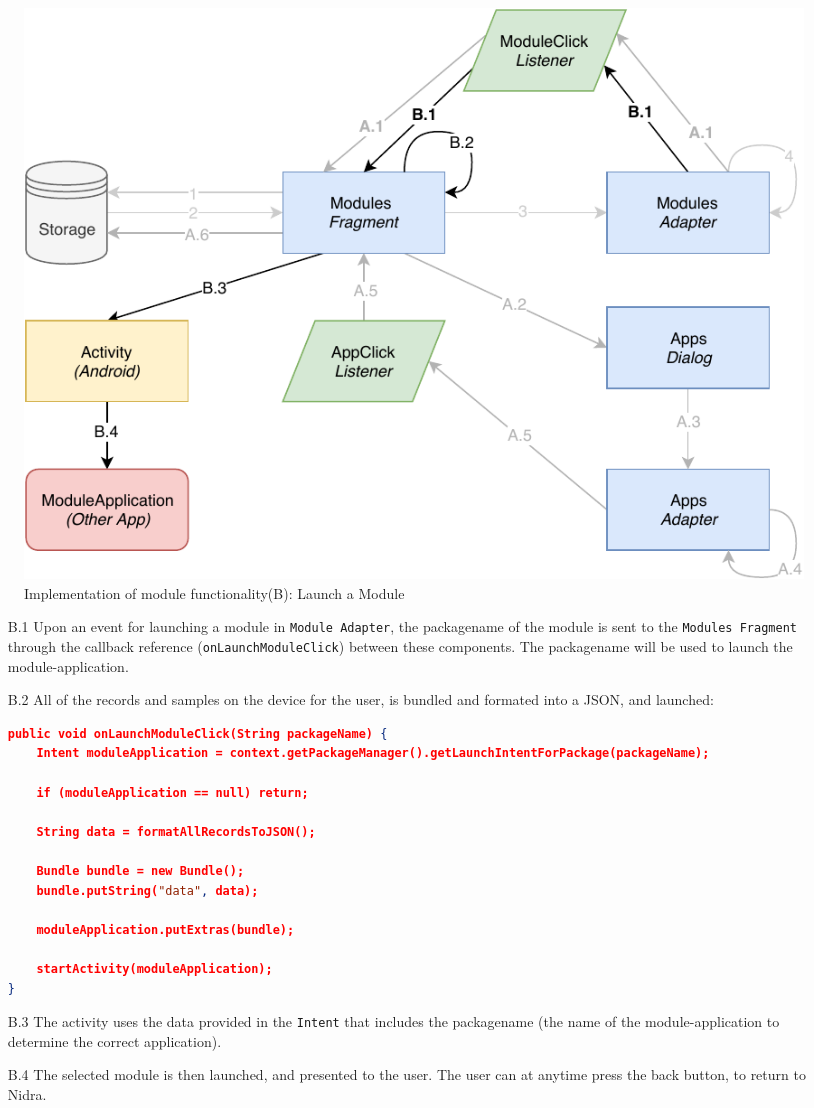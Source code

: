 \begin{figure}
    \centering
    \includegraphics[scale=0.7]{images/Module_ImpB.pdf}
    \caption{Implementation of module functionality(B): Launch a Module}
    \label{fig:impl_modulesB}
\end{figure}

\begin{itemize}
    \item[B.1] Upon an event for launching a module in \verb|Module Adapter|, the packagename of the module is sent to the \verb|Modules Fragment| through the callback reference (\verb|onLaunchModuleClick|) between these components. The packagename  will be used to launch the module-application.
    \item[B.2] All of the records and samples on the device for the user, is bundled and formated into a JSON, and launched:
\begin{lstlisting}[language=json, caption={My Caption}, captionpos=b]
public void onLaunchModuleClick(String packageName) {
    Intent moduleApplication = context.getPackageManager().getLaunchIntentForPackage(packageName);

    if (moduleApplication == null) return;

    String data = formatAllRecordsToJSON();

    Bundle bundle = new Bundle();
    bundle.putString("data", data);

    moduleApplication.putExtras(bundle);

    startActivity(moduleApplication);
}
\end{lstlisting}

    \item[B.3] The activity uses the data provided in the \verb|Intent| that includes the packagename (the name of the module-application to determine the correct application).
    \item[B.4] The selected module is then launched, and presented to the user. The user can at anytime press the back button, to return to Nidra.  
\end{itemize}

